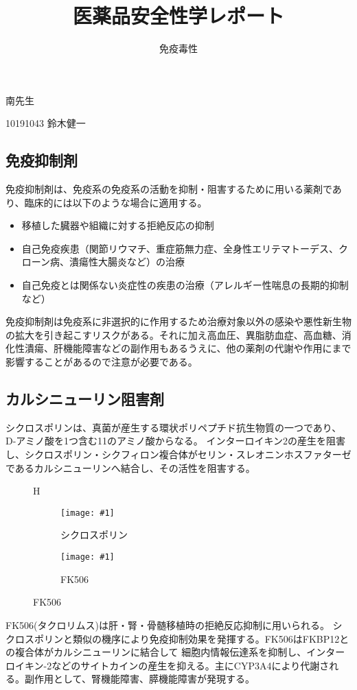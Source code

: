 \documentclass[a4paper,papersize,dvipdfmx]{jsarticle}
\newcommand{\piccap}[3]{\begin{figure}[H] \centering \texttt{[image: \#1]} \caption{#3} \label{fig {#1}} \end{figure}} %
\begin{document}
\title{医薬品安全性学レポート}
\author{免疫毒性}
\date{}
\maketitle



\begin{flushright}
南先生

10191043 鈴木健一
\end{flushright}

\subsection*{免疫抑制剤}
免疫抑制剤は、免疫系の免疫系の活動を抑制・阻害するために用いる薬剤であり、臨床的には以下のような場合に適用する。

\begin{itemize}
\item 移植した臓器や組織に対する拒絶反応の抑制
\item 自己免疫疾患（関節リウマチ、重症筋無力症、全身性エリテマトーデス、クローン病、潰瘍性大腸炎など）の治療
\item 自己免疫とは関係ない炎症性の疾患の治療（アレルギー性喘息の長期的抑制など）
\end{itemize}

免疫抑制剤は免疫系に非選択的に作用するため治療対象以外の感染や悪性新生物の拡大を引き起こすリスクがある。それに加え高血圧、異脂肪血症、高血糖、消化性潰瘍、肝機能障害などの副作用もあるうえに、他の薬剤の代謝や作用にまで影響することがあるので注意が必要である。


\subsection*{カルシニューリン阻害剤}
シクロスポリンは、真菌が産生する環状ポリペプチド抗生物質の一つであり、D-アミノ酸を1つ含む11のアミノ酸からなる。
インターロイキン2の産生を阻害し、シクロスポリン・シクフィロン複合体がセリン・スレオニンホスファターゼであるカルシニューリンへ結合し、その活性を阻害する。

\begin{figure}{H}
\centering
\begin{minipage}{0.22\hsize}
\piccap{cyc.png}{2.5}{シクロスポリン}
\end{minipage}
\begin{minipage}{0.06\hsize}
\hspace{2mm}
\end{minipage}
\begin{minipage}{0.22\hsize}
\piccap{fk506.png}{3}{FK506}
\end{minipage}
\end{figure}


FK506(タクロリムス)は肝・腎・骨髄移植時の拒絶反応抑制に用いられる。
シクロスポリンと類似の機序により免疫抑制効果を発揮する。FK506はFKBP12との複合体がカルシニューリンに結合して
細胞内情報伝達系を抑制し、インターロイキン-2などのサイトカインの産生を抑える。主にCYP3A4により代謝される。副作用として、腎機能障害、膵機能障害が発現する。
\end{document}

